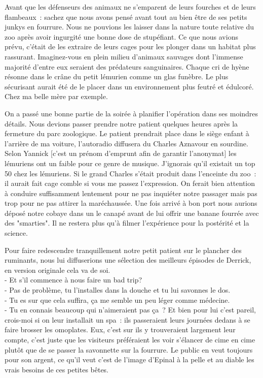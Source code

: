 Avant que les défenseurs des animaux ne s’emparent de leurs fourches et de leurs flambeaux : sachez que nous avons pensé avant tout au bien être de ses petits junkys en fourrure. Nous ne pouvions les laisser dans la nature toute relative du zoo après avoir ingurgité une bonne dose de stupéfiant. Ce que nous avions prévu, c’était de les extraire de leurs cages pour les plonger dans un habitat plus rassurant. Imaginez-vous en plein milieu d’animaux sauvages dont l’immense majorité d’entre eux seraient des prédateurs sanguinaires. Chaque cri de hyène résonne dans le crâne du petit lémurien comme un glas funèbre. Le plus sécurisant aurait été de le placer dans un environnement plus feutré et édulcoré. Chez ma belle mère par exemple.

On a passé une bonne partie de la soirée à planifier l’opération dans ses moindres détails. Nous devions passer prendre notre patient quelques heures après la fermeture du parc zoologique. Le patient prendrait place dans le siège enfant à l’arrière de ma voiture, l’autoradio diffusera du Charles Aznavour en sourdine. Selon Yannick [c’est un prénom d’emprunt afin de garantir l’anonymat] les lémuriens ont un faible pour ce genre de musique. J’ignorais qu’il existait un top 50 chez les lémuriens. Si le grand Charles s’était produit dans l’enceinte du zoo : il aurait fait cage comble si vous me passez l’expression. On ferait bien attention à conduire suffisamment lentement pour ne pas inquiéter notre passager mais pas trop pour ne pas attirer la maréchaussée. Une fois arrivé à bon port nous aurions déposé notre cobaye dans un le canapé avant de lui offrir une banane fourrée avec des "smarties". Il ne restera plus qu’à filmer l’expérience pour la postérité et la science. 

Pour faire redescendre tranquillement notre petit patient sur le plancher des ruminants, nous lui diffuserions une sélection des meilleurs épisodes de Derrick, en version originale cela va de soi. \\

- Et s’il commence à nous faire un bad trip?\\
- Pas de problème, tu l’installes dans la douche et tu lui savonnes le dos.\\
- Tu es sur que cela suffira, ça me semble un peu léger comme médecine. \\
- Tu en connais beaucoup qui n’aimeraient pas ça ? Et bien pour lui c’est pareil, crois-moi si on leur installait un spa : ils passeraient leurs journées dedans à se faire brosser les omoplates. Eux, c’est sur ils y trouveraient largement leur compte, c’est juste que les visiteurs préféraient les voir s’élancer de cime en cime plutôt que de se passer la savonnette sur la fourrure. Le public en veut toujours pour son argent, ce qu’il veut c’est de l’image d’Epinal à la pelle et au diable les vrais besoins de ces petites bêtes. \\

